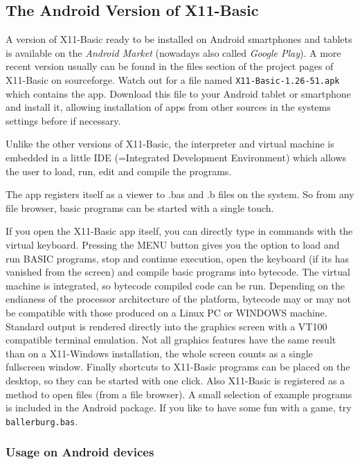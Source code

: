 \subsection{The Android Version of X11-Basic}

A version of X11-Basic ready to be installed on Android smartphones and tablets
is available on the {\it Android Market} (nowadays also called {\it Google Play}). 
A more recent version usually can be found in the files section of the project 
pages of X11-Basic on sourceforge. Watch out for a file named 
\verb|X11-Basic-1.26-51.apk| which contains the app.  Download this file to 
your Android tablet or smartphone and install it, allowing installation 
of apps from other sources in the systems settings before if necessary.

Unlike the other versions of X11-Basic, the interpreter and virtual machine is
embedded in a little IDE (=Integrated Development Environment) which allows the
user to load, run, edit and compile the programs.

The app registers itself as a viewer to .bas and .b files on the system. So
from any file browser, basic programs can be started with a single touch. 

If you open the X11-Basic app itself, you can directly type in commands with
the virtual keyboard. Pressing the MENU button gives you the option to load and
run BASIC programs, stop and continue execution, open the keyboard (if its has
vanished from the screen) and compile basic programs into bytecode. The virtual
machine is integrated, so bytecode compiled code can be run. Depending on the
endianess of the processor architecture of the platform, bytecode may or may not
be compatible with those produced on a Linux PC or WINDOWS machine. Standard
output is rendered directly into the graphics screen with a VT100 compatible
terminal emulation. Not all graphics features have the same result than on a
X11-Windows installation, the whole screen counts as a single fullscreen
window. Finally shortcuts to X11-Basic programs can be placed on the desktop,
so they can be started with one click. Also X11-Basic is registered as a method
to open files (from a file browser).  A small selection of example programs is
included in the Android package. If you like to have some fun with a game, try
\verb|ballerburg.bas|.

\subsubsection{Usage on Android devices}

